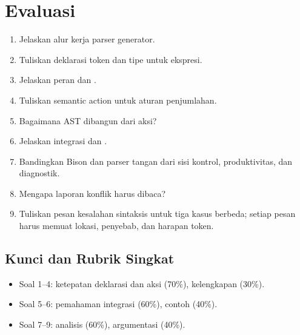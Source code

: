 \section*{Evaluasi}

\begin{enumerate}[label=\arabic*.,leftmargin=*]
  \item Jelaskan alur kerja parser generator.
  \item Tuliskan deklarasi token dan tipe untuk ekspresi.
  \item Jelaskan peran  dan .
  \item Tuliskan semantic action untuk aturan penjumlahan.
  \item Bagaimana AST dibangun dari aksi?
  \item Jelaskan integrasi  dan .
  \item Bandingkan Bison dan parser tangan dari sisi kontrol,
        produktivitas, dan diagnostik.
  \item Mengapa laporan konflik harus dibaca?
  \item Tuliskan pesan kesalahan sintaksis untuk tiga kasus berbeda;
        setiap pesan harus memuat lokasi, penyebab, dan harapan token.
\end{enumerate}

\subsection*{Kunci dan Rubrik Singkat}
\begin{itemize}[leftmargin=*]
  \item Soal 1--4: ketepatan deklarasi dan aksi (70\%),
        kelengkapan (30\%).
  \item Soal 5--6: pemahaman integrasi (60\%), contoh (40\%).
  \item Soal 7--9: analisis (60\%), argumentasi (40\%).
\end{itemize}
